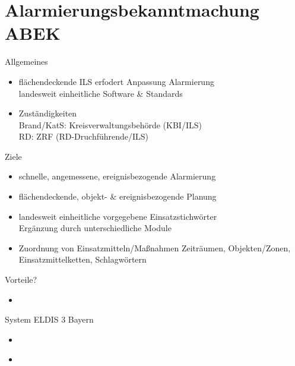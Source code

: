 \section{Alarmierungsbekanntmachung ABEK}
\begin{sectionbox}{Allgemeines}
    \begin{itemize}
        \item flächendeckende ILS erfodert Anpassung Alarmierung\\
        \ra landesweit einheitliche Software \& Standards
        \item Zuständigkeiten\\
        \ra Brand/KatS: Kreisverwaltungsbehörde (KBI/ILS)\\
        \ra RD: ZRF (RD-Druchführende/ILS)
    \end{itemize}
\end{sectionbox}
\begin{sectionbox}{Ziele}
    \begin{itemize}
        \item schnelle, angemessene, ereignisbezogende Alarmierung
        \item flächendeckende, objekt- \& ereignisbezogende Planung
        \item landesweit einheitliche vorgegebene Einsatzstichwörter\\
        \ra Ergänzung durch unterschiedliche Module
        \item Zuordnung von Einsatzmitteln/Maßnahmen
        \ra Zeiträumen, Objekten/Zonen, Einsatzmittelketten, Schlagwörtern
    \end{itemize}
\end{sectionbox}
\begin{sectionbox}{Vorteile?}
    \begin{itemize}
        \item 
    \end{itemize}
\end{sectionbox}
\begin{sectionbox}{System ELDIS 3 Bayern}
    \begin{itemize}
        \item 
    \end{itemize}
\end{sectionbox}
\begin{sectionbox}{}
    \begin{itemize}
        \item 
    \end{itemize}
\end{sectionbox}
